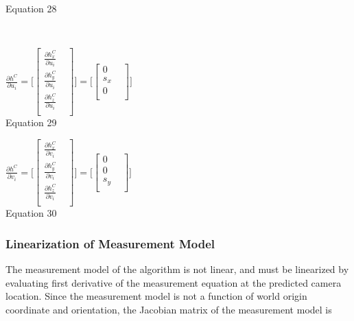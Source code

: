Equation 28

\ \ \ \ 

$\frac{\partial h^{C}}{\partial u_{i}}=\lbrack \begin{bmatrix}
\frac{\partial h_{x}^{C}}{\partial u_{i}} & \\
\frac{\partial h_{y}^{C}}{\partial u_{i}} & \\
\frac{\partial h_{z}^{C}}{\partial u_{i}} & \\
\end{bmatrix}
\rbrack =\lbrack \begin{bmatrix}
0 & \\
s_{x} & \\
0 & \\
\end{bmatrix}
\rbrack $\\


Equation 29



$\frac{\partial h^{C}}{\partial v_{i}}=\lbrack \begin{bmatrix}
\frac{\partial h_{x}^{C}}{\partial v_{i}} & \\
\frac{\partial h_{y}^{C}}{\partial v_{i}} & \\
\frac{\partial h_{z}^{C}}{\partial v_{i}} & \\
\end{bmatrix}
\rbrack =\lbrack \begin{bmatrix}
0 & \\
0 & \\
s_{y} & \\
\end{bmatrix}
\rbrack $\\


Equation 30



\subsubsection{Linearization of Measurement Model}
The measurement model of the algorithm is not linear, and must be 
linearized by evaluating first derivative of the measurement equation at 
the predicted camera location. Since the measurement model is not a 
function of world origin coordinate and orientation, the Jacobian matrix 
of the measurement model is\ \ \ \ 

